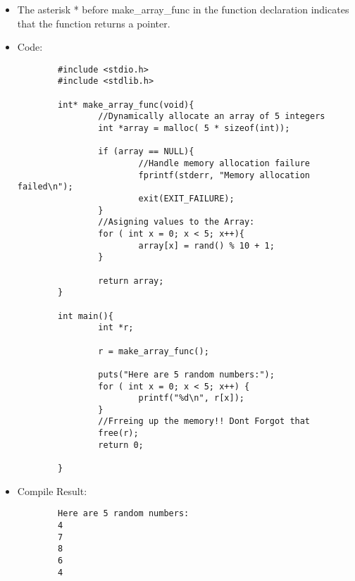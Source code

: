 \begin{itemize}
\item The asterisk * before make\_array\_func in the function declaration indicates that the function returns a pointer.
\end{itemize}

\begin{itemize}
\item Code:
\begin{lstlisting}
        #include <stdio.h>
        #include <stdlib.h>
        
        int* make_array_func(void){
                //Dynamically allocate an array of 5 integers
                int *array = malloc( 5 * sizeof(int));
        
                if (array == NULL){
                        //Handle memory allocation failure
                        fprintf(stderr, "Memory allocation failed\n");
                        exit(EXIT_FAILURE);
                }
                //Asigning values to the Array:
                for ( int x = 0; x < 5; x++){
                        array[x] = rand() % 10 + 1;
                }
        
                return array;
        }
        
        int main(){
                int *r;
        
                r = make_array_func();
        
                puts("Here are 5 random numbers:");
                for ( int x = 0; x < 5; x++) {
                        printf("%d\n", r[x]);
                }
                //Frreing up the memory!! Dont Forgot that
                free(r);
                return 0;
        
        }

\end{lstlisting}
\item Compile Result:
\begin{lstlisting}
        Here are 5 random numbers:
        4
        7
        8
        6
        4
\end{lstlisting}
\end{itemize}

